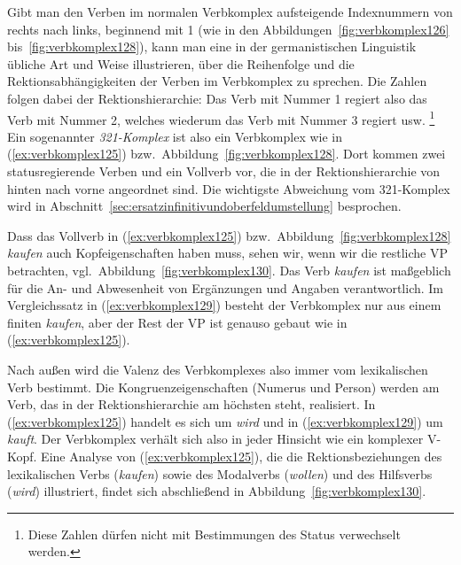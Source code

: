 Gibt man den Verben im normalen Verbkomplex aufsteigende Indexnummern von rechts nach links, beginnend mit 1 (wie in den Abbildungen~\ref{fig:verbkomplex126} bis~\ref{fig:verbkomplex128}), kann man eine in der germanistischen Linguistik übliche Art und Weise illustrieren, über die Reihenfolge und die Rektionsabhängigkeiten der Verben im Verbkomplex zu sprechen.
Die Zahlen folgen dabei der Rektionshierarchie:
Das Verb mit Nummer 1 regiert also das Verb mit Nummer 2, welches wiederum das Verb mit Nummer 3 regiert usw.%
\footnote{Diese Zahlen dürfen nicht mit Bestimmungen des Status verwechselt werden.}
Ein sogenannter \textit{321-Komplex} ist also ein Verbkomplex wie in (\ref{ex:verbkomplex125}) bzw.\ Abbildung~\ref{fig:verbkomplex128}.
Dort kommen zwei statusregierende Verben und ein Vollverb vor, die in der Rektionshierarchie von hinten nach vorne angeordnet sind.
Die wichtigste Abweichung vom 321-Komplex wird in Abschnitt~\ref{sec:ersatzinfinitivundoberfeldumstellung} besprochen.

Dass das Vollverb in (\ref{ex:verbkomplex125}) bzw.\ Abbildung~\ref{fig:verbkomplex128} \textit{kaufen} auch Kopfeigenschaften haben muss, sehen wir, wenn wir die restliche VP betrachten, vgl.\ Abbildung~\ref{fig:verbkomplex130}.
Das Verb \textit{kaufen} ist maßgeblich für die An- und Abwesenheit von Ergänzungen und Angaben verantwortlich.
Im Vergleichssatz in (\ref{ex:verbkomplex129}) besteht der Verbkomplex nur aus einem finiten \textit{kaufen}, aber der Rest der VP ist genauso gebaut wie in (\ref{ex:verbkomplex125}).

\begin{exe}
\end{exe}

Nach außen wird die Valenz des Verbkomplexes also immer vom lexikalischen Verb bestimmt.
Die Kongru\-enz\-ei\-gen\-schaf\-ten (Numerus und Person) werden am Verb, das in der Rektionshierarchie am höchsten steht, realisiert.
In (\ref{ex:verbkomplex125}) handelt es sich um \textit{wird} und in (\ref{ex:verbkomplex129}) um \textit{kauft}.
Der Verbkomplex verhält sich also in jeder Hinsicht wie ein komplexer V-Kopf.
Eine Analyse von (\ref{ex:verbkomplex125}), die die Rektionsbeziehungen des lexikalischen Verbs (\textit{kaufen}) sowie des Modalverbs (\textit{wollen}) und des Hilfsverbs (\textit{wird}) illustriert, findet sich abschließend in Abbildung~\ref{fig:verbkomplex130}.


